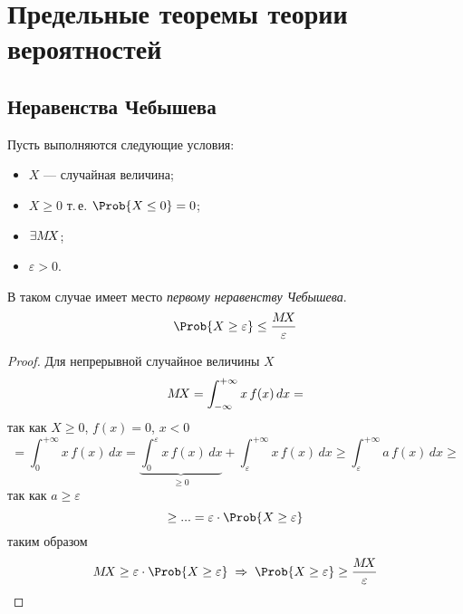 
\section{Предельные теоремы теории вероятностей}


\subsection{Неравенства Чебышева}

\begin{thm} Пусть выполняются следующие условия:
	\begin{itemize}
		\item $X$ --- случайная величина;
		\item $X \geq 0$ т.\,е. $\Prob \{ X \leq 0 \} = 0$;
		\item $\exists M\!X$;
		\item $\varepsilon > 0$.
	\end{itemize}
	В таком случае имеет место \emph{первому неравенству Чебышева}.
	\begin{equation}
		\Prob \{ X \geq \varepsilon \} \leq \frac{\mx}{\varepsilon}
	\end{equation}
\end{thm}

\begin{proof}
	Для непрерывной случайное величины $X$
	\[
		M\!X = \int_{-\infty}^{+\infty} x\, f(x)\, dx =
	\]
	так как $X \geq 0$, $f(x) = 0$, $x < 0$
	\[
		= \int_{0}^{+\infty} x\, f(x)\, dx = \underbrace{\int_{0}^{\varepsilon} x\, f(x)\, dx}_{\geq 0} + \int_{\varepsilon}^{+\infty} x\, f(x)\, dx \geq \int_{\varepsilon}^{+\infty} a\, f(x)\, dx \geq
	\]
	так как $a \geq \varepsilon$
	\[
		\geq ... = \varepsilon \cdot \Prob \{ X \geq \varepsilon \}
	\]
	таким образом
	\[
		\mx \geq \varepsilon \cdot \Prob \{ X \geq \varepsilon \} \;\Rightarrow\; \Prob \{ X \geq \varepsilon \} \geq \frac{\mx}{\varepsilon}
	\]
	
\end{proof}